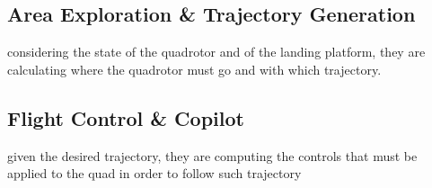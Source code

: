 \subsection{Area Exploration \& Trajectory Generation}
considering the state of the quadrotor and of the landing platform, they are calculating where the quadrotor must go and with which trajectory. 

\subsection{Flight Control \& Copilot}
given the desired trajectory, they are computing the controls that must be applied to the quad in order to follow such trajectory

